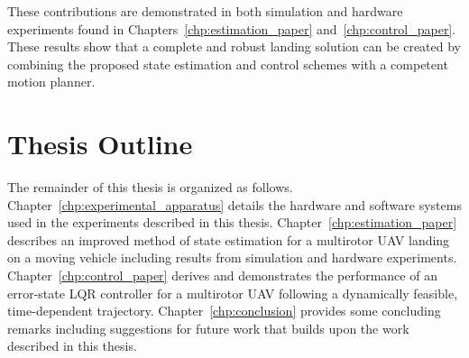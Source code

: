 These contributions are demonstrated in both simulation and hardware
experiments found in Chapters~\ref{chp:estimation_paper}
and~\ref{chp:control_paper}. These results 
show that a
complete and robust landing solution can be created by combining the proposed
state estimation and control schemes with a competent motion planner.

\section{Thesis Outline}

The remainder of this thesis is organized as follows.
Chapter~\ref{chp:experimental_apparatus} details the hardware and software
systems used
in the experiments described in this thesis.
Chapter~\ref{chp:estimation_paper}
describes an improved method of state estimation for a multirotor UAV landing on
a moving vehicle including results from simulation and hardware experiments.
Chapter~\ref{chp:control_paper} derives and demonstrates the performance of
an error-state LQR controller for a
multirotor UAV following a dynamically feasible, time-dependent trajectory.
Chapter~\ref{chp:conclusion} provides some concluding remarks including
suggestions for future work that builds upon the work described in this
thesis.
